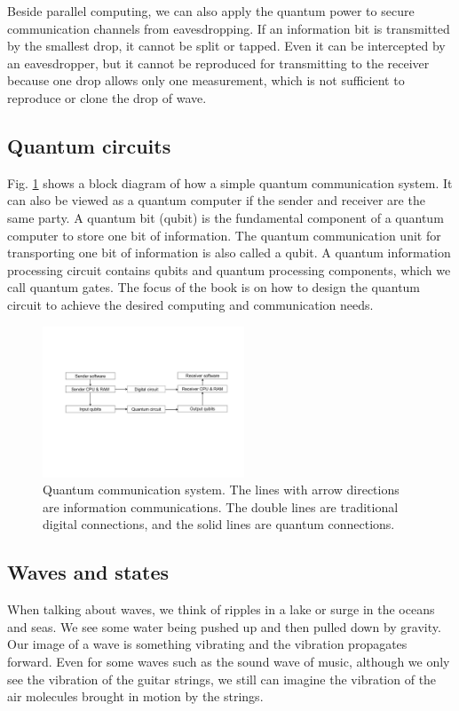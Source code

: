 \documentclass{book}
\begin{document}
Beside parallel computing, we can also apply the quantum power to secure communication channels from eavesdropping. If an information bit is transmitted by the smallest drop, it cannot be split or tapped. Even it can be intercepted by an eavesdropper, but it cannot be reproduced for transmitting to the receiver because one drop allows only one measurement, which is not sufficient to reproduce or clone the drop of wave.

\subsection{Quantum circuits}
Fig. \ref{qsystem} shows a block diagram of how a simple quantum communication system. It can also be viewed as a quantum computer if the sender and receiver are the same party. A quantum bit (qubit) is the fundamental component of a quantum computer to store one bit of information. The quantum communication unit for transporting one bit of information is also called a qubit. A quantum information processing circuit contains qubits and quantum processing components, which we call quantum gates. The focus of the book is on how to design the quantum circuit to achieve the desired computing and communication needs.

\begin{figure}[ht]
\includegraphics[width=6cm]{pic/q-circuit.pdf}
\caption{Quantum communication system. The lines with arrow directions are information communications. The double lines are traditional digital connections, and the solid lines are quantum connections. }
\label{qsystem}
\end{figure}

\subsection{Waves and states}
When talking about waves, we think of ripples in a lake or surge in the oceans and seas. We see some water being pushed up and then pulled down by gravity. Our image of a wave is something vibrating and the vibration propagates forward. Even for some waves such as the sound wave of music, although we only see the vibration of the guitar strings, we still can imagine the vibration of the air molecules brought in motion by the strings.
\end{document}
